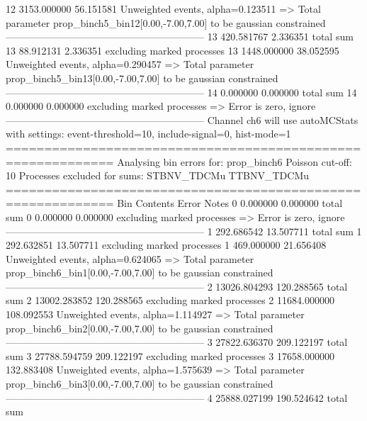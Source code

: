 12         3153.000000     56.151581       Unweighted events, alpha=0.123511
  => Total parameter prop_binch5_bin12[0.00,-7.00,7.00] to be gaussian constrained
------------------------------------------------------------
13         420.581767      2.336351        total sum                     
13         88.912131       2.336351        excluding marked processes    
13         1448.000000     38.052595       Unweighted events, alpha=0.290457
  => Total parameter prop_binch5_bin13[0.00,-7.00,7.00] to be gaussian constrained
------------------------------------------------------------
14         0.000000        0.000000        total sum                     
14         0.000000        0.000000        excluding marked processes    
  => Error is zero, ignore      
------------------------------------------------------------
Channel ch6 will use autoMCStats with settings: event-threshold=10, include-signal=0, hist-mode=1
============================================================
Analysing bin errors for: prop_binch6
Poisson cut-off: 10
Processes excluded for sums: STBNV_TDCMu TTBNV_TDCMu
============================================================
Bin        Contents        Error           Notes                         
0          0.000000        0.000000        total sum                     
0          0.000000        0.000000        excluding marked processes    
  => Error is zero, ignore      
------------------------------------------------------------
1          292.686542      13.507711       total sum                     
1          292.632851      13.507711       excluding marked processes    
1          469.000000      21.656408       Unweighted events, alpha=0.624065
  => Total parameter prop_binch6_bin1[0.00,-7.00,7.00] to be gaussian constrained
------------------------------------------------------------
2          13026.804293    120.288565      total sum                     
2          13002.283852    120.288565      excluding marked processes    
2          11684.000000    108.092553      Unweighted events, alpha=1.114927
  => Total parameter prop_binch6_bin2[0.00,-7.00,7.00] to be gaussian constrained
------------------------------------------------------------
3          27822.636370    209.122197      total sum                     
3          27788.594759    209.122197      excluding marked processes    
3          17658.000000    132.883408      Unweighted events, alpha=1.575639
  => Total parameter prop_binch6_bin3[0.00,-7.00,7.00] to be gaussian constrained
------------------------------------------------------------
4          25888.027199    190.524642      total sum                     
